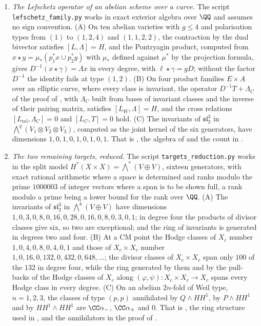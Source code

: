 \begin{enumerate}[label=\textup{(\Roman*)},leftmargin=*]
\item \emph{The Lefschetz operator of an abelian scheme over a curve.} The
  script \texttt{lefschetz\_\allowbreak family.py} works in exact exterior
  algebra over $\QQ$ and assumes no sign convention. (A) On ten abelian
  varieties with $g\le4$ and polarisation types from $(1)$ to $(1,2,4)$ and
  $(1,1,2,2)$, the contraction by the dual bivector satisfies
  $[L,\Lambda]=H$, and the Pontryagin product, computed from
  $x\star y=\mu_{*}(p_{1}^{*}x\cup p_{2}^{*}y)$ with $\mu_{*}$ defined against
  $\mu^{*}$ by the projection formula, gives $D^{-1}(x\star\gamma)=\Lambda x$
  in every degree, with $\ell\star\gamma=gD$; without the factor $D^{-1}$ the
  identity fails at type $(1,2)$. (B) On four product families $E\times A$
  over an elliptic curve, where every class is invariant, the operator
  $D^{-1}T+\Lambda_{C}$ of the proof of , with
  $\Lambda_{C}$ built from bases of invariant classes and the inverse of their
  pairing matrix, satisfies $[L_{W},\Lambda]=H$, and the cross relations
  $[L_{\mathrm{rel}},\Lambda_{C}]=0$ and $[L_{C},T]=0$ hold. (C) The invariants
  of $\mathfrak{sl}_{2}^{3}$ in $\bigwedge^{q}(V_{1}\otimes V_{2}\otimes V_{3})$,
  computed as the joint kernel of the six generators, have dimensions
  $1,0,1,0,1,0,1,0,1$. That is , the algebra of
   and the count in .

\item \emph{The two remaining targets, reduced.} The script
  \texttt{targets\_\allowbreak reduction.py} works in the split model
  $H^{*}(X\times X)=\bigwedge^{*}(V\oplus V)$, sixteen generators, with
  exact rational arithmetic where a space is determined and ranks modulo the
  prime $1000003$ of integer vectors where a span is to be shown full, a rank
  modulo a prime being a lower bound for the rank over $\QQ$. (A) The
  invariants of $\mathfrak{sl}_{2}^{3}$ in $\bigwedge^{k}(V\oplus V)$ have
  dimensions $1,0,3,0,8,0,16,0,28,0,16,0,8,0,3,0,1$; in degree four the
  products of divisor classes give six, so two are exceptional; and the ring
  of invariants is generated in degrees two and four. (B) At a CM point the
  Hodge classes of $X_{c}$ number $1,0,4,0,8,0,4,0,1$ and those of
  $X_{c}\times X_{c}$ number $1,0,16,0,132,0,432,0,648,\dots$; the divisor
  classes of $X_{c}\times X_{c}$ span only $100$ of the $132$ in degree four,
  while the ring generated by them and by the pull-backs of the Hodge classes of
  $X_{c}$ along $(\varphi,\psi)\colon X_{c}\times X_{c}\to X_{c}$ spans every
  Hodge class in every degree. (C) On an abelian $2n$-fold of Weil type,
  $n=1,2,3$, the classes of type $(p,p)$ annihilated by $Q\wedge HH^{1}$, by
  $P\wedge HH^{1}$ and by $HH^{1}\wedge HH^{1}$ are $\CC\alpha_{-}$,
  $\CC\alpha_{+}$ and $0$. That is , the ring structure
  used in , and the annihilators in the proof of
  .


\end{enumerate}
